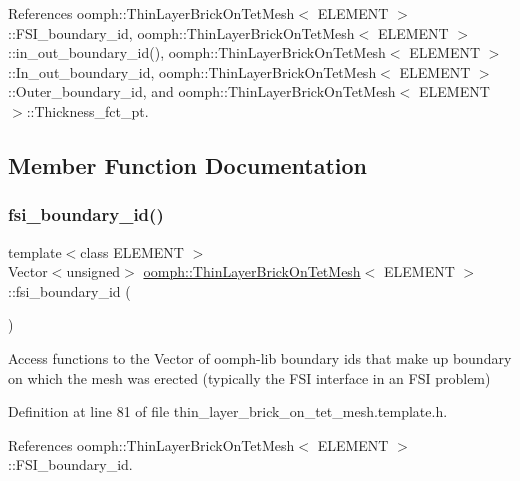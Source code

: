 References oomph\+::\+Thin\+Layer\+Brick\+On\+Tet\+Mesh$<$ E\+L\+E\+M\+E\+N\+T $>$\+::\+F\+S\+I\+\_\+boundary\+\_\+id, oomph\+::\+Thin\+Layer\+Brick\+On\+Tet\+Mesh$<$ E\+L\+E\+M\+E\+N\+T $>$\+::in\+\_\+out\+\_\+boundary\+\_\+id(), oomph\+::\+Thin\+Layer\+Brick\+On\+Tet\+Mesh$<$ E\+L\+E\+M\+E\+N\+T $>$\+::\+In\+\_\+out\+\_\+boundary\+\_\+id, oomph\+::\+Thin\+Layer\+Brick\+On\+Tet\+Mesh$<$ E\+L\+E\+M\+E\+N\+T $>$\+::\+Outer\+\_\+boundary\+\_\+id, and oomph\+::\+Thin\+Layer\+Brick\+On\+Tet\+Mesh$<$ E\+L\+E\+M\+E\+N\+T $>$\+::\+Thickness\+\_\+fct\+\_\+pt.



\subsection{Member Function Documentation}
\mbox{\label{classoomph_1_1ThinLayerBrickOnTetMesh_ada2e50ab8dfb631a26fc4111eb2fe9ad}} 
\subsubsection{\texorpdfstring{fsi\+\_\+boundary\+\_\+id()}{fsi\_boundary\_id()}}
{\footnotesize\ttfamily template$<$class E\+L\+E\+M\+E\+NT $>$ \\
Vector$<$unsigned$>$ \hyperlink{classoomph_1_1ThinLayerBrickOnTetMesh}{oomph\+::\+Thin\+Layer\+Brick\+On\+Tet\+Mesh}$<$ E\+L\+E\+M\+E\+NT $>$\+::fsi\+\_\+boundary\+\_\+id (\begin{DoxyParamCaption}{ }\end{DoxyParamCaption})\hspace{0.3cm}{\ttfamily [inline]}}



Access functions to the Vector of oomph-\/lib boundary ids that make up boundary on which the mesh was erected (typically the F\+SI interface in an F\+SI problem) 



Definition at line 81 of file thin\+\_\+layer\+\_\+brick\+\_\+on\+\_\+tet\+\_\+mesh.\+template.\+h.



References oomph\+::\+Thin\+Layer\+Brick\+On\+Tet\+Mesh$<$ E\+L\+E\+M\+E\+N\+T $>$\+::\+F\+S\+I\+\_\+boundary\+\_\+id.

